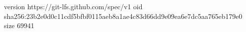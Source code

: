 version https://git-lfs.github.com/spec/v1
oid sha256:23b2e0d0c11cdf5bfbf0115aeb8a1ae4c83d66dd9e09ea6e7dc5aa765eb179e0
size 69941
